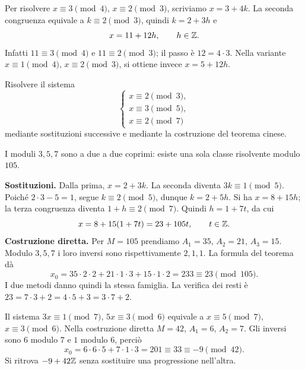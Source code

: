 \begin{esempio}
Per risolvere $x\equiv3\pmod4$, $x\equiv2\pmod3$, scriviamo $x=3+4k$. La seconda congruenza equivale a $k\equiv2\pmod3$, quindi $k=2+3h$ e
\[
x=11+12h,\qquad h\in\mathbb{Z}.
\]
Infatti $11\equiv3\pmod4$ e $11\equiv2\pmod3$; il passo è $12=4\cdot3$. Nella variante $x\equiv1\pmod4$, $x\equiv2\pmod3$, si ottiene invece $x=5+12h$.
\end{esempio}

\begin{esercizio}
Risolvere il sistema
\[
\begin{cases}
x\equiv2\pmod3,\\
x\equiv3\pmod5,\\
x\equiv2\pmod7
\end{cases}
\]
mediante sostituzioni successive e mediante la costruzione del teorema cinese.
\end{esercizio}
\begin{svolgimento}
I moduli $3,5,7$ sono a due a due coprimi: esiste una sola classe risolvente modulo $105$.

\textbf{Sostituzioni.} Dalla prima, $x=2+3k$. La seconda diventa $3k\equiv1\pmod5$. Poiché $2\cdot3-5=1$, segue $k\equiv2\pmod5$, dunque $k=2+5h$. Si ha $x=8+15h$; la terza congruenza diventa $1+h\equiv2\pmod7$. Quindi $h=1+7t$, da cui
\[
x=8+15(1+7t)=23+105t,\qquad t\in\mathbb{Z}.
\]
\textbf{Costruzione diretta.} Per $M=105$ prendiamo $A_1=35$, $A_2=21$, $A_3=15$. Modulo $3,5,7$ i loro inversi sono rispettivamente $2,1,1$. La formula del teorema dà
\[
x_0=35\cdot2\cdot2+21\cdot1\cdot3+15\cdot1\cdot2=233\equiv23\pmod{105}.
\]
I due metodi danno quindi la stessa famiglia. La verifica dei resti è $23=7\cdot3+2=4\cdot5+3=3\cdot7+2$.
\end{svolgimento}

\begin{esempio}
Il sistema $3x\equiv1\pmod7$, $5x\equiv3\pmod6$ equivale a $x\equiv5\pmod7$, $x\equiv3\pmod6$. Nella costruzione diretta $M=42$, $A_1=6$, $A_2=7$. Gli inversi sono $6$ modulo $7$ e $1$ modulo $6$, perciò
\[
x_0=6\cdot6\cdot5+7\cdot1\cdot3=201\equiv33\equiv-9\pmod{42}.
\]
Si ritrova $-9+42\mathbb{Z}$ senza sostituire una progressione nell'altra.
\end{esempio}
